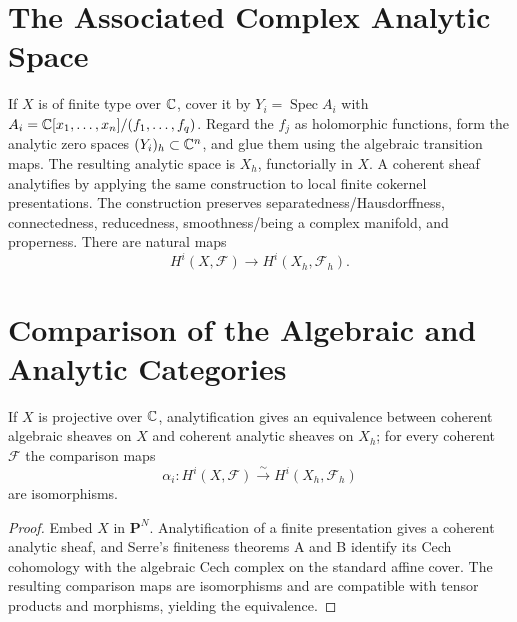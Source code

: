 \section{The Associated Complex Analytic Space}
\label{ha-appB-sec1}

\begin{construction}[Analytification]
If $X$ is of finite type over $\mathbb C$, cover it by $Y_i=\operatorname{Spec}A_i$
with $A_i=\mathbb C[x_1,\ldots,x_n]/(f_1,\ldots,f_q)$.  Regard the $f_j$ as
holomorphic functions, form the analytic zero spaces $(Y_i)_h\subset\mathbb C^n$,
and glue them using the algebraic transition maps.  The resulting analytic
space is $X_h$, functorially in $X$.  A coherent sheaf analytifies by applying
the same construction to local finite cokernel presentations.  The
construction preserves separatedness/Hausdorffness, connectedness,
reducedness, smoothness/being a complex manifold, and properness.  There are
natural maps
\[
H^i(X,\mathcal F)\longrightarrow H^i(X_h,\mathcal F_h).
\]
\end{construction}

\section{Comparison of the Algebraic and Analytic Categories}
\label{ha-appB-sec2}

\begin{theorem}[GAGA]
\label{ha-appB-thm2-1}
If $X$ is projective over $\mathbb C$, analytification gives an equivalence between
coherent algebraic sheaves on $X$ and coherent analytic sheaves on $X_h$;
for every coherent $\mathcal F$ the comparison maps
\[
\alpha_i:H^i(X,\mathcal F)\xrightarrow{\sim}H^i(X_h,\mathcal F_h)
\]
are isomorphisms.

\end{theorem}
\begin{proof}
Embed $X$ in $\mathbf P^N$.  Analytification of a finite presentation gives a coherent analytic
sheaf, and Serre's finiteness theorems A and B identify its Cech cohomology with the algebraic Cech
complex on the standard affine cover.  The resulting comparison maps are isomorphisms and are
compatible with tensor products and morphisms, yielding the equivalence.
\end{proof}

